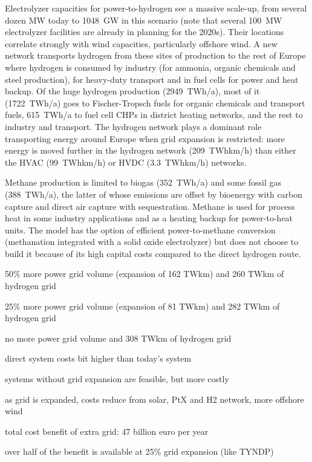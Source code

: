 Electrolyzer capacities for power-to-hydrogen see a massive scale-up,
from several dozen MW today to 1048~GW in this scenario (note that
several 100~MW electrolyzer facilities are already in planning for the
2020s). Their locations correlate strongly with wind capacities,
particularly offshore wind. A new network
transports hydrogen from these sites of production to the rest of
Europe where hydrogen is consumed by industry (for ammonia, organic
chemicals and steel production), for heavy-duty transport and in fuel
cells for power and heat backup. Of the huge hydrogen production
(2949~TWh/a), most of it (1722~TWh/a) goes to Fischer-Tropsch fuels
for organic chemicals and transport fuels, 615~TWh/a to fuel cell CHPs
in district heating networks, and the rest to industry and transport.
The hydrogen network plays a dominant role transporting energy around
Europe when grid expansion is restricted: more energy is moved further
in the hydrogen network (209~TWhkm/h) than either the HVAC
(99~TWhkm/h) or HVDC (3.3~TWhkm/h) networks.

Methane production is limited to biogas (352~TWh/a) and some fossil
gas (388~TWh/a), the latter of whose emissions are offset by bioenergy
with carbon capture and direct air capture with sequestration.
Methane is used for process heat in some industry applications and as
a heating backup for power-to-heat units. The model has the option of
efficient power-to-methane conversion (methanation integrated with a
solid oxide electrolyzer) but does not choose to build it because of
its high capital costs compared to the direct hydrogen route.

50\% more power grid volume (expansion of 162 TWkm) and 260 TWkm of hydrogen grid

25\% more power grid volume (expansion of 81 TWkm) and 282 TWkm of hydrogen grid

no more power grid volume and 308 TWkm of hydrogen grid

direct system costs bit higher than today's system

systems without grid expansion are feasible, but more costly

as grid is expanded, costs reduce from solar, PtX and H2 network, more offshore wind

total cost benefit of extra grid: 47 billion euro per year

over half of the benefit is available at 25\% grid expansion (like TYNDP)


